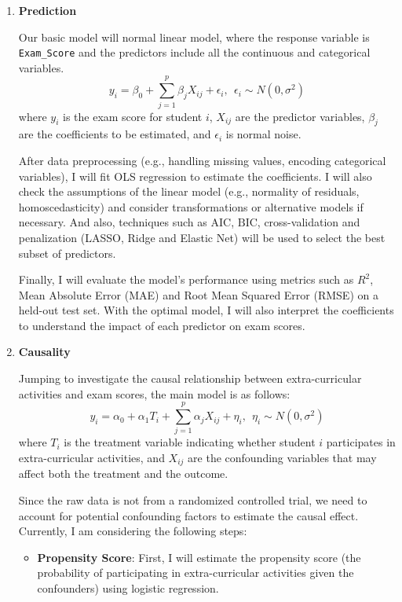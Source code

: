 \documentclass[11pt]{article}
\begin{document}
\begin{enumerate}
    \item \textbf{Prediction}

    Our basic model will normal linear model, where the response variable is \texttt{Exam\_Score} and the predictors include all the continuous and categorical variables.
\begin{equation*}
y_i = \beta_0 + \sum_{j=1}^{p} \beta_j X_{ij} + \epsilon_i, ~~ \epsilon_i \sim N(0, \sigma^2)
\end{equation*}
where $y_i$ is the exam score for student $i$, $X_{ij}$ are the predictor variables, $\beta_j$ are the coefficients to be estimated, and $\epsilon_i$ is normal noise.

    After data preprocessing (e.g., handling missing values, encoding categorical variables), I will fit OLS regression to estimate the coefficients. I will also check the assumptions of the linear model (e.g., normality of residuals, homoscedasticity) and consider transformations or alternative models if necessary. And also, techniques such as $\mathrm{AIC}$, $\mathrm{BIC}$, cross-validation and penalization (LASSO, Ridge and Elastic Net) will be used to select the best subset of predictors. 
    
    Finally, I will evaluate the model's performance using metrics such as $R^2$, Mean Absolute Error (MAE) and Root Mean Squared Error (RMSE) on a held-out test set. With the optimal model, I will also interpret the coefficients to understand the impact of each predictor on exam scores.
    \item \textbf{Causality}
    
    Jumping to investigate the causal relationship between extra-curricular activities and exam scores, the main model is as follows:
\begin{equation*}
y_i = \alpha_0 + \alpha_1 T_i + \sum_{j=1}^{p} \alpha_j X_{ij} + \eta_i, ~~ \eta_i \sim N(0, \sigma^2)
\end{equation*}
where $T_i$ is the treatment variable indicating whether student $i$ participates in extra-curricular activities, and $X_{ij}$ are the confounding variables that may affect both the treatment and the outcome.

Since the raw data is not from a randomized controlled trial, we need to account for potential confounding factors to estimate the causal effect. Currently, I am considering the following steps:
\begin{itemize}
    \item \textbf{Propensity Score}: First, I will estimate the propensity score (the probability of participating in extra-curricular activities given the confounders) using logistic regression.
    

\end{itemize}
\end{enumerate}
\end{document}
